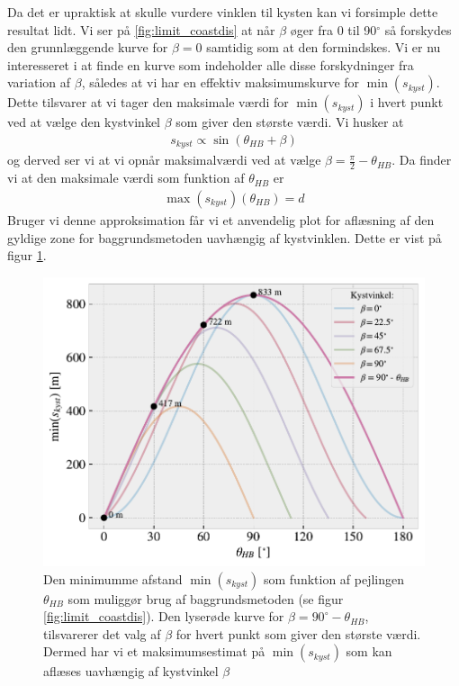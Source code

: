 \documentclass[%
 reprint,
nofootinbib,
aps,
]{revtex4-1}
\begin{document}
Da det er upraktisk at skulle vurdere vinklen til kysten kan vi forsimple dette resultat lidt. Vi ser på \ref{fig:limit_coastdis} at når $\beta$ øger fra 0 til 90$^{\circ}$ så forskydes den grunnlæggende kurve for $\beta = 0$ samtidig som at den formindskes. Vi er nu interesseret i at finde en kurve som indeholder alle disse forskydninger fra variation af $\beta$, således at vi har en effektiv maksimumskurve for $\min{(s_{kyst})}$. Dette tilsvarer at vi tager den maksimale værdi for $\min{(s_{kyst})}$ i hvert punkt ved at vælge den kystvinkel $\beta$ som giver den største værdi. Vi husker at
\begin{align*}
  s_{kyst} \propto \sin{(\theta_{HB} + \beta)}
\end{align*}
og derved ser vi at vi opnår maksimalværdi ved at vælge $\beta = \frac{\pi}{2} - \theta_{HB}$. Da finder vi at den maksimale værdi som funktion af $\theta_{HB}$ er
\begin{align}
  \max{(s_{kyst})}(\theta_{HB}) = d
  \label{eq:max_s_kyst}
\end{align}
Bruger vi denne approksimation får vi et anvendelig plot for aflæsning af den gyldige zone for baggrundsmetoden uavhængig af kystvinklen. Dette er vist på figur \ref{fig:limit_coastdis_betamax}.
\begin{figure}[H]
  \includegraphics[width=\linewidth]{figures/limit_coastdis_betamax.pdf}
  \caption{Den minimumme afstand $\min{(s_{kyst})}$ som funktion af pejlingen $\theta_{HB}$ som muliggør brug af baggrundsmetoden (se figur \ref{fig:limit_coastdis}). Den lyserøde kurve for $\beta = 90^{\circ} - \theta_{HB}$, tilsvarerer det valg af $\beta$ for hvert punkt som giver den største værdi. Dermed har vi et maksimumsestimat på $\min{(s_{kyst})}$ som kan aflæses uavhængig af kystvinkel $\beta$ }
  \label{fig:limit_coastdis_betamax}
\end{figure}
\end{document}
